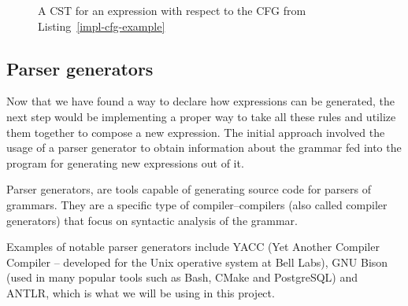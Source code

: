 \documentclass[]{usiinfbachelorproject}
\begin{document}
\begin{figure}[ht]
\centering
{}
\caption{A CST for an expression with respect to the CFG from
Listing~\ref{impl-cfg-example}}
\label{impl-cfg-example-tree}
\end{figure}

\subsection{Parser generators}\label{impl-parse}


Now that we have found a way to declare how expressions can be generated,
the next step would be implementing a proper way to take all these rules
and utilize them together to compose a new expression. The initial approach
involved the usage of a parser generator to obtain information about the
grammar fed into the program for generating new expressions out of it.

Parser generators, are tools capable of generating source code for parsers
of grammars. They are a specific type of compiler–compilers (also called
compiler generators) that focus on syntactic analysis of the grammar.

Examples of notable parser generators include YACC (Yet Another Compiler
Compiler – developed for the Unix operative system at Bell Labs), GNU Bison
(used in many popular tools such as Bash, CMake and PostgreSQL) and ANTLR,
which is what we will be using in this project.
\end{document}
